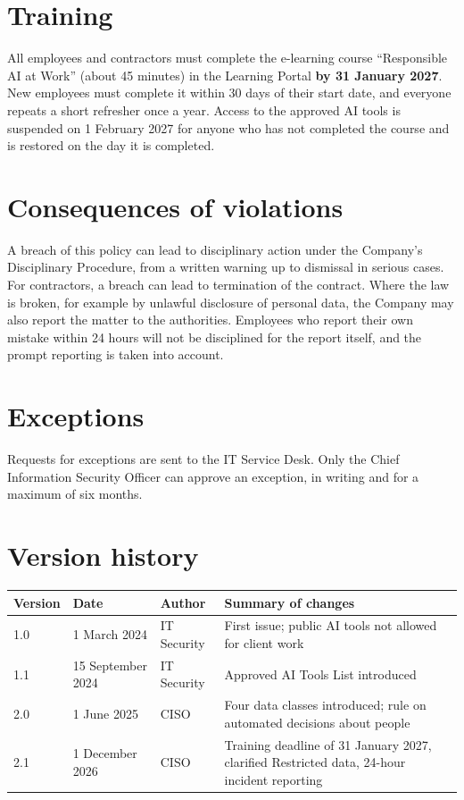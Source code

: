 \documentclass[10.5pt,a4paper]{article}
\begin{document}
\section{Training}
All employees and contractors must complete the e-learning course ``Responsible AI at Work'' (about 45 minutes) in the
Learning Portal \textbf{by 31 January 2027}. New employees must complete it within 30 days of their start date, and
everyone repeats a short refresher once a year. Access to the approved AI tools is suspended on 1 February 2027 for anyone
who has not completed the course and is restored on the day it is completed.

\section{Consequences of violations}
A breach of this policy can lead to disciplinary action under the Company's Disciplinary Procedure, from a
written warning up to dismissal in serious cases. For contractors, a breach can lead to termination of the contract.
Where the law is broken, for example by unlawful disclosure of personal data, the Company may also report the matter
to the authorities. Employees who report their own mistake within 24 hours will not be disciplined for the report
itself, and the prompt reporting is taken into account.

\section{Exceptions}
Requests for exceptions are sent to the IT Service Desk. Only the Chief Information Security Officer can approve an
exception, in writing and for a maximum of six months.

\section{Version history}
\begin{center}
\small
\begin{tabularx}{\linewidth}{@{}l l l X@{}}
  \toprule
  \textbf{Version} & \textbf{Date} & \textbf{Author} & \textbf{Summary of changes} \\
  \midrule
  1.0 & 1 March 2024 & IT Security & First issue; public AI tools not allowed for client work \\
  1.1 & 15 September 2024 & IT Security & Approved AI Tools List introduced \\
  2.0 & 1 June 2025 & CISO & Four data classes introduced; rule on automated decisions about people \\
  2.1 & 1 December 2026 & CISO & Training deadline of 31 January 2027, clarified Restricted data, 24-hour incident reporting \\
  \bottomrule
\end{tabularx}
\end{center}
\end{document}
